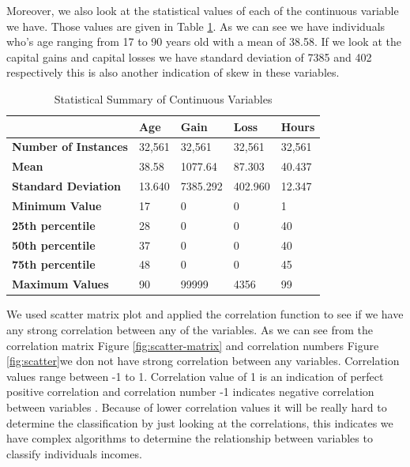 \documentclass[sigconf]{acmart}
\begin{document}
\par Moreover, we also look at the statistical values of each of the continuous variable we have. Those values are given in Table \ref{my-label}. As we can see we have individuals who's age ranging from 17 to 90 years old with a mean of 38.58. If we look at the capital gains and capital losses we have standard deviation of 7385 and 402 respectively this is also another indication of skew in these variables. 

\begin{table}[!ht]
\centering
\begin{tabular}{|l|l|l|l|l|}
\hline
                    & \textbf{Age} & \textbf{Gain} & \textbf{Loss} & \textbf{Hours} \\ \hline
\textbf{Number of Instances} & 32,561 & 32,561       & 32,561       & 32,561         \\ \hline
\textbf{Mean}                & 38.58  & 1077.64      & 87.303       & 40.437         \\ \hline
\textbf{Standard Deviation}  & 13.640 & 7385.292     & 402.960      & 12.347         \\ \hline
\textbf{Minimum Value}       & 17     & 0            & 0            & 1              \\ \hline
\textbf{25th percentile}     & 28     & 0            & 0            & 40             \\ \hline
\textbf{50th percentile}     & 37     & 0            & 0            & 40             \\ \hline
\textbf{75th percentile}     & 48     & 0            & 0            & 45             \\ \hline
\textbf{Maximum Values}      & 90     & 99999        & 4356         & 99             \\ \hline
\end{tabular}
\caption{Statistical Summary of Continuous Variables}
\label{my-label}
\end{table}

\par We used scatter matrix plot and applied the correlation function to see if we have any strong correlation between any of the variables. As we can see from the correlation matrix Figure \ref{fig:scatter-matrix} and correlation numbers Figure \ref{fig:scatter}we don not have strong correlation between any variables. Correlation values range between -1 to 1. Correlation value of 1 is an indication of perfect positive correlation and correlation number -1 indicates negative correlation between variables \cite{www-investopedia}. Because of lower correlation values it will be really hard to determine the classification by just looking at the correlations, this indicates we have complex algorithms to determine the relationship between variables to classify individuals incomes. 
\end{document}
